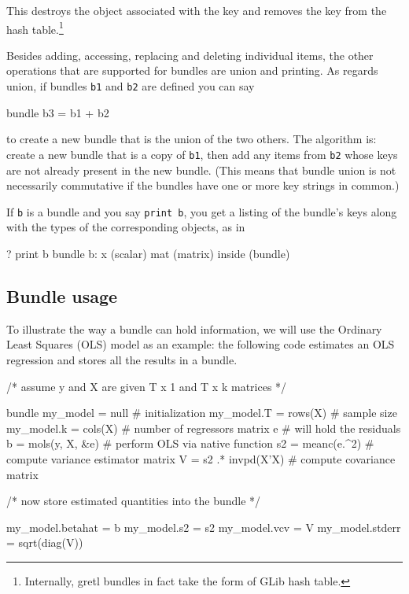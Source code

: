 This destroys the object associated with the key and removes the key
from the hash table.\footnote{Internally, gretl bundles in fact take
  the form of \textsf{GLib} hash table.}

Besides adding, accessing, replacing and deleting individual items,
the other operations that are supported for bundles are union and
printing. As regards union, if bundles \texttt{b1} and \texttt{b2} are
defined you can say

\begin{code}
bundle b3 = b1 + b2
\end{code}

to create a new bundle that is the union of the two others. The
algorithm is: create a new bundle that is a copy of \texttt{b1}, then
add any items from \texttt{b2} whose keys are not already present in
the new bundle. (This means that bundle union is not necessarily
commutative if the bundles have one or more key strings in common.)

If \texttt{b} is a bundle and you say \texttt{print b}, you get a
listing of the bundle's keys along with the types of the corresponding
objects, as in

\begin{code}
? print b
bundle b:
 x (scalar)
 mat (matrix)
 inside (bundle)
\end{code}

\subsection{Bundle usage}
\label{sec:bundle-usage}

To illustrate the way a bundle can hold information, we will use the
Ordinary Least Squares (OLS) model as an example: the following code
estimates an OLS regression and stores all the results in a bundle.

\begin{code}
/* assume y and X are given T x 1 and T x k matrices */

bundle my_model = null               # initialization
my_model.T = rows(X)                 # sample size
my_model.k = cols(X)                 # number of regressors
matrix e                             # will hold the residuals
b = mols(y, X, &e)                   # perform OLS via native function
s2 = meanc(e.^2)                     # compute variance estimator
matrix V = s2 .* invpd(X'X)          # compute covariance matrix

/* now store estimated quantities into the bundle */

my_model.betahat = b
my_model.s2 = s2
my_model.vcv = V
my_model.stderr = sqrt(diag(V))
\end{code}

